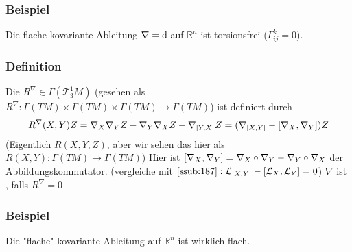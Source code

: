 \subsubsection{Beispiel}
\label{ssub:217}
Die flache kovariante Ableitung $\nabla = \mathrm{d}\mkern-1.0mu$ auf $\mathds{R}^n$ ist torsionsfrei ($\Gamma_{ij}^k = 0$).

\subsubsection[Definition: Krümmung von $\nabla$]{Definition}
\label{ssub:218}
Die  $R^\nabla \in \Gamma(\mathcal{T}_3^1 M)$ (gesehen als $R^\nabla: \Gamma(TM)\times \Gamma(TM) \times \Gamma(TM) \to \Gamma(TM)$) ist definiert durch
\[
R^\nabla (X,Y) Z = \nabla_X \nabla_Y Z - \nabla_Y \nabla_X Z - \nabla_{[Y,X]}Z = (\nabla_{[X,Y]} - [\nabla_X,\nabla_Y])Z
\]
(Eigentlich $R(X,Y,Z)$, aber wir sehen das hier als $R(X,Y):\Gamma(TM)\to \Gamma(TM)$)
Hier ist $[\nabla_X,\nabla_Y] = \nabla_X \circ \nabla_Y - \nabla_Y \circ \nabla_X$ der Abbildungskommutator. (vergleiche mit $\ref{ssub:187}: \mathcal{L}_{[X,Y]} - [\mathcal{L}_X,\mathcal{L}_Y] = 0$) $\nabla$ ist , falls $R^\nabla = 0$

\subsubsection{Beispiel}
\label{ssub:219}
Die "flache" kovariante Ableitung auf $\mathds{R}^n$ ist wirklich flach.

